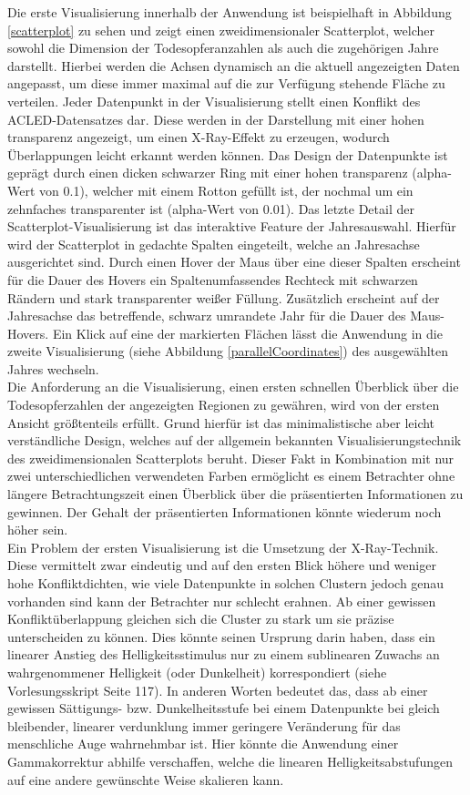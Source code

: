 \documentclass[usegeometry=true]{scrartcl}
\begin{document}
Die erste Visualisierung innerhalb der Anwendung ist beispielhaft in Abbildung \ref{scatterplot} zu sehen und zeigt einen zweidimensionaler Scatterplot, welcher sowohl die Dimension der Todesopferanzahlen als auch die zugehörigen Jahre darstellt. Hierbei werden die Achsen dynamisch an die aktuell angezeigten Daten angepasst, um diese immer maximal auf die zur Verfügung stehende Fläche zu verteilen. Jeder Datenpunkt in der Visualisierung stellt einen Konflikt des ACLED-Datensatzes dar. Diese werden in der Darstellung mit einer hohen transparenz angezeigt, um einen X-Ray-Effekt zu erzeugen, wodurch Überlappungen leicht erkannt werden können. Das Design der Datenpunkte ist geprägt durch einen dicken schwarzer Ring mit einer hohen transparenz (alpha-Wert von 0.1), welcher mit einem Rotton gefüllt ist, der nochmal um ein zehnfaches transparenter ist (alpha-Wert von 0.01). Das letzte Detail der Scatterplot-Visualisierung ist das interaktive Feature der Jahresauswahl. Hierfür wird der Scatterplot in gedachte Spalten eingeteilt, welche an Jahresachse ausgerichtet sind. Durch einen Hover der Maus über eine dieser Spalten erscheint für die Dauer des Hovers ein Spaltenumfassendes Rechteck mit schwarzen Rändern und stark transparenter weißer Füllung. Zusätzlich erscheint auf der Jahresachse das betreffende, schwarz umrandete Jahr für die Dauer des Maus-Hovers. Ein Klick auf eine der markierten Flächen lässt die Anwendung in die zweite Visualisierung (siehe Abbildung \ref{parallelCoordinates}) des ausgewählten Jahres wechseln.\\ Die Anforderung an die Visualisierung, einen ersten schnellen Überblick über die Todesopferzahlen der angezeigten Regionen zu gewähren, wird von der ersten Ansicht größtenteils erfüllt. Grund hierfür ist das minimalistische aber leicht verständliche Design, welches auf der allgemein bekannten Visualisierungstechnik des zweidimensionalen Scatterplots beruht. Dieser Fakt in Kombination mit nur zwei unterschiedlichen verwendeten Farben ermöglicht es einem Betrachter ohne längere Betrachtungszeit einen Überblick über die präsentierten Informationen zu gewinnen. Der Gehalt der präsentierten Informationen könnte wiederum noch höher sein.\\ Ein Problem der ersten Visualisierung ist die Umsetzung der X-Ray-Technik. Diese vermittelt zwar eindeutig und auf den ersten Blick höhere und weniger hohe Konfliktdichten, wie viele Datenpunkte in solchen Clustern jedoch genau vorhanden sind kann der Betrachter nur schlecht erahnen. Ab einer gewissen Konfliktüberlappung gleichen sich die Cluster zu stark um sie präzise unterscheiden zu können. Dies könnte seinen Ursprung darin haben, dass ein linearer Anstieg des Helligkeitsstimulus nur zu einem sublinearen Zuwachs an wahrgenommener Helligkeit (oder Dunkelheit) korrespondiert (siehe Vorlesungsskript Seite 117). In anderen Worten bedeutet das, dass ab einer gewissen Sättigungs- bzw. \glqq Dunkelheitsstufe\grqq{} bei einem Datenpunkte bei gleich bleibender, linearer verdunklung immer geringere Veränderung für das menschliche Auge wahrnehmbar ist. Hier könnte die Anwendung einer Gammakorrektur abhilfe verschaffen, welche die linearen Helligkeitsabstufungen auf eine andere gewünschte Weise skalieren kann. 
\end{document}
